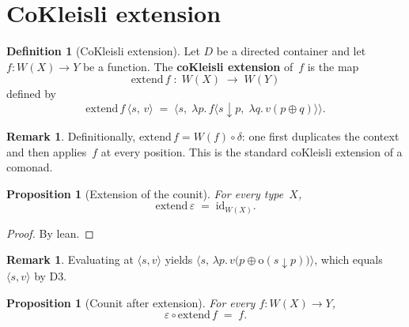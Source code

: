 \documentclass[11pt,a4paper]{article}
\theoremstyle{plain}
\newtheorem{proposition}[theorem]{Proposition}
\theoremstyle{definition}
\newtheorem{definition}[theorem]{Definition}
\newtheorem{remark}[theorem]{Remark}
\newcommand{\id}{\mathrm{id}}
\newcommand{\rootp}{\mathrm{o}}
\begin{document}
\section{CoKleisli extension}

\begin{definition}[CoKleisli extension]\label{def:extend}
Let $D$ be a directed container and let $f : W(X) \to Y$ be a function. The
\textbf{coKleisli extension} of~$f$ is the map
\begin{equation}
  \mathrm{extend}\,f \;:\; W(X) \;\longrightarrow\; W(Y)
\end{equation}
defined by
\begin{equation}
  \mathrm{extend}\,f\,\bigl\langle s,\, v \bigr\rangle
  \;=\;
  \bigl\langle s,\;
    \lambda p.\,
      f\bigl\langle
        s \downarrow p,\;
        \lambda q.\, v(p \oplus q)
      \bigr\rangle
  \bigr\rangle.
\end{equation}
\end{definition}

\begin{remark}
Definitionally, $\mathrm{extend}\,f = W(f) \circ \delta$: one first duplicates
the context and then applies~$f$ at every position. This is the standard
coKleisli extension of a comonad.
\end{remark}

\begin{proposition}[Extension of the counit]\label{prop:extend-counit}
For every type~$X$,
\begin{equation}
  \mathrm{extend}\,\varepsilon \;=\; \id_{W(X)}.
\end{equation}
\end{proposition}

\begin{proof}
By lean.
\end{proof}

\begin{remark}
Evaluating at $\langle s, v\rangle$ yields
$\langle s,\, \lambda p.\, v\bigl(p \oplus \rootp(s \downarrow p)\bigr)\rangle$,
which equals $\langle s, v\rangle$ by D3.
\end{remark}

\begin{proposition}[Counit after extension]\label{prop:counit-extend}
For every $f : W(X) \to Y$,
\begin{equation}
  \varepsilon \circ \mathrm{extend}\,f \;=\; f.
\end{equation}
\end{proposition}
\end{document}
